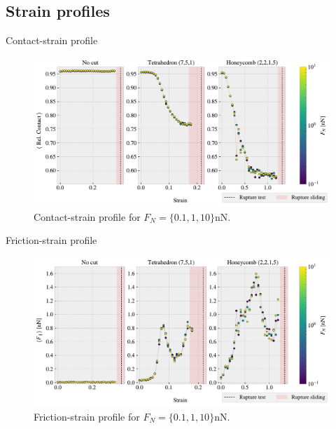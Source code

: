 \documentclass[
	10pt, %
]{beamer}
\begin{document}
\subsection{Strain profiles}
\begin{frame}{Contact-strain profile}

	\begin{figure}[H]
		\centering
		\includegraphics[width=1\linewidth]{../thesis/figures/baseline/multi_stretch_area_compare.pdf}
		\caption{Contact-strain profile for $F_N = \{0.1, 1, 10\} \text{nN}$.}
	\end{figure}
\end{frame}
%
%
\begin{frame}{Friction-strain profile}
	\begin{figure}[H]
		\centering
		\includegraphics[width=1\linewidth]{../thesis/figures/baseline/multi_stretch_mean_compare.pdf}
		\caption{Friction-strain profile for $F_N = \{0.1, 1, 10\} \text{nN}$.}
	\end{figure}
\end{frame}
%
%
\end{document}
